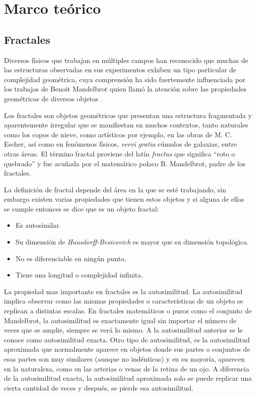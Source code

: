 \chapter{Marco te\'{o}rico}
\label{chap:mt}

\section{Fractales}
\label{sec:fractales}

Diversos f\'{i}sicos que trabajan en m\'{u}ltiples campos han reconocido que muchas de las estructuras observadas en sus experimentos exhiben un tipo particular de complejidad geom\'{e}trica, cuya comprensi\'{o}n ha sido fuertemente influenciada por los trabajos de Benoit Mandelbrot quien llam\'{o} la atenci\'{o}n sobre las propiedades geom\'{e}tricas de diversos objetos \cite{Vicsek1992}.

Los fractales son objetos geom\'{e}tricos que presentan una estructura fragmentada y aparentemente irregular que se manifiestan en muchos contextos, tanto naturales como los copos de nieve, como art\'{i}sticos por ejemplo, en las obras de M. C. Escher, as\'{i} como en fen\'{o}menos f\'{i}sicos, \textit{vervi gratia} c\'{u}mulos de galaxias, entre otras \'{a}reas. El t\'{e}rmino fractal  proviene del lat\'{i}n \textit{fractus} que significa ``roto o quebrado'' y fue acuñada por el matem\'{a}tico polaco B. Mandelbrot, padre de los fractales.

La definici\'{o}n de fractal depende del \'{a}rea en la que se est\'{e} trabajando, sin embargo existen varias propiedades que tienen estos objetos y si alguna de ellas se cumple entonces se dice que es un objeto fractal:

\begin{itemize}
	\item Es autosimilar.
	\item Su dimensi\'{o}n de \textit{Hausdorff-Besicovich} es mayor que su dimensi\'{o}n topol\'{o}gica.
	\item No es diferenciable en ning\'{u}n punto.
	\item Tiene una longitud o complejidad infinita.
\end{itemize}

La  propiedad mas importante en fractales es la autosimilitud. La autosimilitud implica observar como las mismas propiedades o caracter\'{i}sticas de un objeto se replican a distintas escalas. En fractales matem\'{a}ticos o puros como el conjunto de Mandelbrot, la autosimilitud es exactamente igual sin importar el n\'{u}mero de veces que se amplie, siempre se ver\'{a} lo mismo. A la autosimilitud anterior se le conoce como autosimilitud exacta. Otro tipo de autosimilitud, es la autosimilitud aproximada que normalmente aparece en objetos donde sus partes o conjuntos de esas partes son muy similares (aunque no ind\'{e}nticas) y en su mayor\'{i}a, aparecen en la naturaleza, como en las arterias o venas de la retina de un ojo. A diferencia de la autosimilitud exacta, la autosimilitud aproximada solo se puede replicar una cierta cantidad de veces y despu\'{e}s, se pierde esa autosimilitud.

